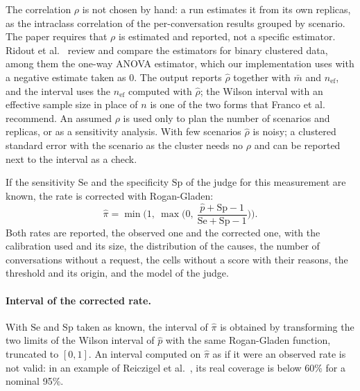 \documentclass[11pt,a4paper]{article}
\begin{document}
The correlation $\rho$ is not chosen by hand: a run estimates it from its own replicas, as the intraclass
correlation of the per-conversation results grouped by scenario. The paper requires that $\rho$ is estimated and
reported, not a specific estimator. Ridout et al.~\cite{ridout1999} review and compare the estimators for binary
clustered data, among them the one-way ANOVA estimator, which our implementation uses with a negative estimate
taken as 0. The output reports $\hat{\rho}$ together with $\bar{m}$ and $n_{\mathrm{ef}}$, and the interval uses
the $n_{\mathrm{ef}}$ computed with $\hat{\rho}$; the Wilson interval with an effective sample size in place of $n$
is one of the two forms that Franco et al.~\cite{franco2019} recommend. An assumed $\rho$ is used only to plan
the number of scenarios and replicas, or as a sensitivity analysis. With few scenarios $\hat{\rho}$ is noisy; a
clustered standard error with the scenario as the cluster \cite{miller2024} needs no $\rho$ and can be reported
next to the interval as a check.

If the sensitivity $\mathrm{Se}$ and the specificity $\mathrm{Sp}$ of the judge for this measurement are known, the
rate is corrected with Rogan-Gladen:
\begin{equation}
  \hat{\pi} = \min\!\Big(1,\ \max\!\Big(0,\ \frac{\hat{p} + \mathrm{Sp} - 1}{\mathrm{Se} + \mathrm{Sp} - 1}\Big)\Big).
\end{equation}
Both rates are reported, the observed one and the corrected one, with the calibration used and its size, the
distribution of the causes, the number of conversations without a request, the cells without a score with their
reasons, the threshold and its origin, and the model of the judge.

\paragraph{Interval of the corrected rate.} With $\mathrm{Se}$ and $\mathrm{Sp}$ taken as known, the interval of
$\hat{\pi}$ is obtained by transforming the two limits of the Wilson interval of $\hat{p}$ with the same
Rogan-Gladen function, truncated to $[0,1]$. An interval computed on $\hat{\pi}$ as if it were an observed rate is
not valid: in an example of Reiczigel et al.\ \cite{reiczigel2010}, its real coverage is below 60\% for a
nominal 95\%.
\end{document}
